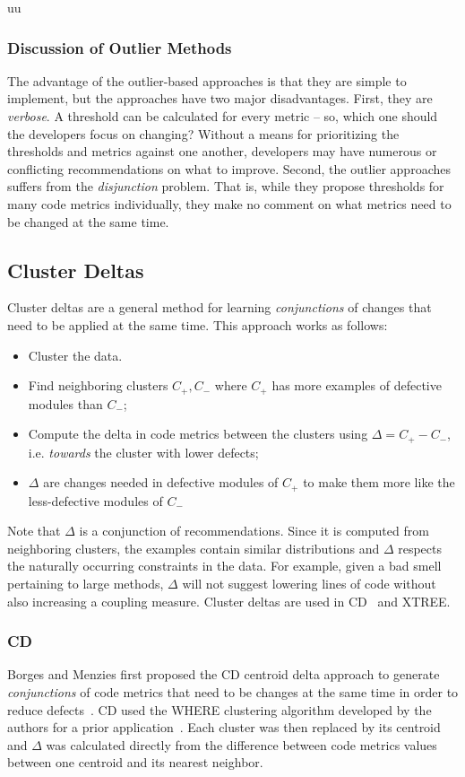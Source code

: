 uu \documentclass[final,twocolumn,5p]{elsarticle}
\theoremstyle{break}
\begin{document}
\subsubsection{Discussion of Outlier Methods}\label{sect:disc}
The advantage of the outlier-based
approaches is that they are simple to implement, but the approaches have   two  major disadvantages. 
First, they are {\em verbose}. A threshold can be calculated for every metric -- so, which one should the developers focus on changing? Without a means for prioritizing the  thresholds and metrics against one another, developers may have numerous or conflicting recommendations on what to improve. Second, the outlier approaches suffers from
the {\em disjunction} problem.
That is, while
 they propose thresholds for many code metrics
individually, they make no comment on what
metrics need to be changed at the same time. 



\subsection{Cluster Deltas}

Cluster deltas are a general method
for learning {\em conjunctions} of changes
that need to be applied at the same time. 
This approach works as follows:
\begin{itemize}
    \item Cluster the data. 
    \item Find
neighboring clusters $C_+,C_-$ where $C_+$ has more examples of defective
modules than $C_-$;
\item Compute the  delta   in code metrics between the clusters using \mbox{$\Delta = C_+ - C_-$}, i.e.
{\em towards} the cluster with lower defects;
\item $\Delta$ are changes needed in defective modules of $C_+$ to
      make them more like the less-defective modules of $C_-$
\end{itemize}
Note that $\Delta$ is a conjunction of  recommendations.
Since it is computed
from neighboring clusters, the examples contain similar distributions and $\Delta$ respects the naturally occurring constraints in the data. For example,
given a bad smell pertaining to large methods,   $\Delta$   will not  suggest lowering lines of code
without also increasing a coupling measure. 
Cluster deltas are used in CD~\cite{me12c} and XTREE.

\subsubsection{CD}\label{sec:cdcd}
Borges and Menzies first proposed the CD centroid delta approach to
generate {\em conjunctions} of code metrics
that need to be changes at the same time
in order to reduce defects~\cite{me12c}.
CD used the WHERE clustering algorithm developed by the
authors for a prior application~\cite{localvsglobal}.
Each cluster was then replaced by its centroid
and $\Delta$ was calculated directly from the difference
between code metrics values between one centroid
and its nearest neighbor.
\end{document}
